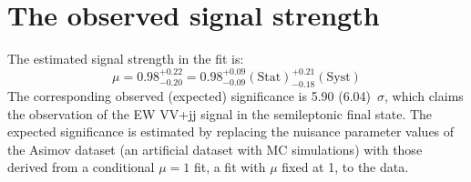 \section{The observed signal strength}
\label{sec:mu}
The estimated signal strength in the fit is:
\begin{equation}
    \mu = 0.98^{+ 0.22}_{- 0.20} = 0.98^{+ 0.09}_{- 0.09}(\mathrm{Stat})^{+ 0.21}_{- 0.18}(\mathrm{Syst}) 
\end{equation}
The corresponding observed (expected) significance is 5.90 (6.04)~$\sigma$, which claims the observation of the EW VV+jj signal in the semileptonic final state. 
The expected significance is estimated by replacing the nuisance parameter values of the Asimov dataset (an artificial dataset with MC simulations) with those derived from a conditional $\mu = 1$ fit, a fit with $\mu$ fixed at 1, to the data. 

